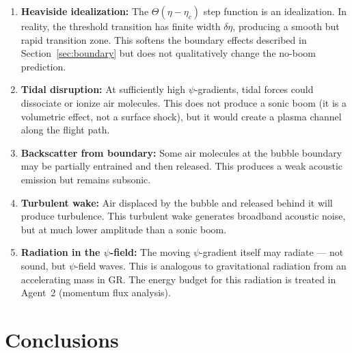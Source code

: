\documentclass[12pt, letterpaper]{article}
\theoremstyle{definition}
\theoremstyle{remark}
\newcommand{\etac}{\eta_c}
\begin{document}
\begin{enumerate}
\item \textbf{Heaviside idealization:} The $\Theta(\eta - \etac)$ step function
is an idealization. In reality, the threshold transition has finite width
$\delta\eta$, producing a smooth but rapid transition zone. This softens the
boundary effects described in Section~\ref{sec:boundary} but does not qualitatively
change the no-boom prediction.

\item \textbf{Tidal disruption:} At sufficiently high $\psi$-gradients, tidal
forces could dissociate or ionize air molecules. This does not produce a
sonic boom (it is a volumetric effect, not a surface shock), but it would
create a plasma channel along the flight path.

\item \textbf{Backscatter from boundary:} Some air molecules at the bubble
boundary may be partially entrained and then released. This produces a weak
acoustic emission but remains subsonic.

\item \textbf{Turbulent wake:} Air displaced by the bubble and released behind
it will produce turbulence. This turbulent wake generates broadband acoustic
noise, but at much lower amplitude than a sonic boom.

\item \textbf{Radiation in the $\psi$-field:} The moving $\psi$-gradient
itself may radiate --- not sound, but $\psi$-field waves. This is analogous to
gravitational radiation from an accelerating mass in GR. The energy budget for
this radiation is treated in Agent~2 (momentum flux analysis).
\end{enumerate}

\section{Conclusions}
\label{sec:conclusions}
\end{document}
